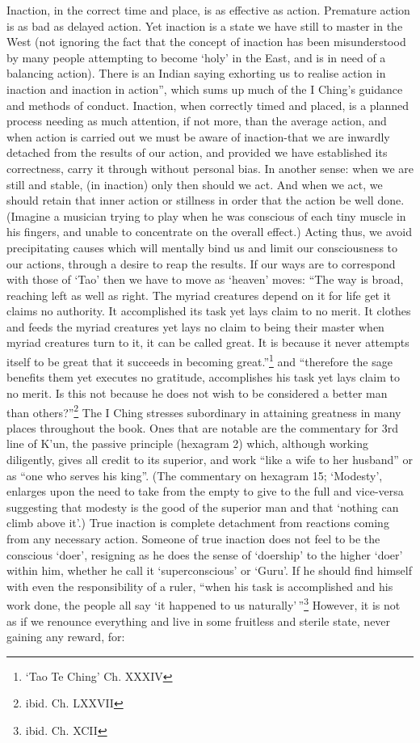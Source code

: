 \documentclass[11pt]{book}
\begin{document}
Inaction, in the correct time and place, is as effective as action. Premature action is as bad as delayed action. Yet inaction is a state we have still to master in the West (not ignoring the fact that the concept of inaction has been misunderstood by many people attempting to become `holy' in the East, and is in need of a balancing action). There is an Indian saying exhorting us to realise action in inaction and inaction in action'', which sums up much of the I Ching's guidance and methods of conduct. Inaction, when correctly timed and placed, is a planned process needing as much attention, if not more, than the average action, and when action is carried out we must be aware of inaction-that we are inwardly detached from the results of our action, and provided we have established its correctness, carry it through without personal bias. In another sense: when we are still and stable, (in inaction) only then should we act. And when we act, we should retain that inner action or stillness in order that the action be well done. (Imagine a musician trying to play when he was conscious of each tiny muscle in his fingers, and unable to concentrate on the overall effect.) Acting thus, we avoid precipitating causes which will mentally bind us and limit our consciousness to our actions, through a desire to reap the results. If our ways are to correspond with those of `Tao' then we have to move as `heaven' moves: ``The way is broad, reaching left as well as right. The myriad creatures depend on it for life get it claims no authority. It accomplished its task yet lays claim to no merit. It clothes and feeds the myriad creatures yet lays no claim to being their master when myriad creatures turn to it, it can be called great. It is because it never attempts itself to be great that it succeeds in becoming great.''\footnote{`Tao Te Ching' Ch. XXXIV} and ``therefore the sage benefits them yet executes no gratitude, accomplishes his task yet lays claim to no merit. Is this not because he does not wish to be considered a better man than others?''\footnote{ibid. Ch. LXXVII} The I Ching stresses subordinary in attaining greatness in many places throughout the book. Ones that are notable are the commentary for 3rd line of K'un, the passive principle (hexagram 2) which, although working diligently, gives all credit to its superior, and work ``like a wife to her husband'' or as ``one who serves his king''. (The commentary on hexagram 15; `Modesty', enlarges upon the need to take from the empty to give to the full and vice-versa suggesting that modesty is the good of the superior man and that `nothing can climb above it'.) True inaction is complete detachment from reactions coming from any necessary action. Someone of true inaction does not feel to be the conscious `doer', resigning as he does the sense of `doership' to the higher `doer' within him, whether he call it `superconscious' or `Guru'. If he should find himself with even the responsibility of a ruler, ``when his task is accomplished and his work done, the people all say `it happened to us naturally'\,''\footnote{ibid. Ch. XCII} However, it is not as if we renounce everything and live in some fruitless and sterile state, never gaining any reward, for:
\end{document}
